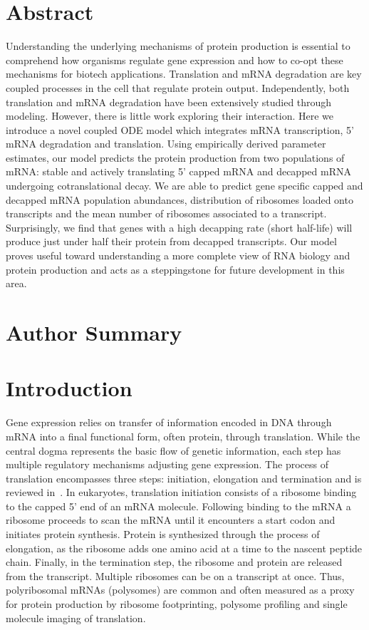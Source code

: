 \documentclass[10pt,letterpaper]{article}
\begin{document}
\section*{Abstract}
Understanding the underlying mechanisms of protein production is essential to comprehend how organisms regulate gene expression and how to co-opt these mechanisms for biotech applications. Translation and mRNA degradation are key coupled processes in the cell that regulate protein output. Independently, both translation and mRNA degradation have been extensively studied through modeling. However, there is little work exploring their interaction. Here we introduce a novel coupled ODE model which integrates mRNA transcription, 5' mRNA degradation and translation. Using empirically derived parameter estimates, our model predicts the protein production from two populations of mRNA: stable and actively translating 5' capped mRNA and decapped mRNA undergoing cotranslational decay. We are able to predict gene specific capped and decapped mRNA population abundances, distribution of ribosomes loaded onto transcripts and the mean number of ribosomes associated to a transcript. Surprisingly, we find that genes with a high decapping rate (short half-life) will produce just under half their protein from decapped transcripts. Our model proves useful toward understanding a more complete view of RNA biology and protein production and acts as a steppingstone for future development in this area. 
 

\section*{Author Summary}




\linenumbers

\section*{Introduction}

Gene expression relies on transfer of information encoded in DNA through mRNA into a final functional form, often protein, through translation. While the central dogma represents the basic flow of genetic information, each step has multiple regulatory mechanisms adjusting gene expression. The process of translation encompasses three steps: initiation, elongation and termination and is reviewed in~\cite{RN1,RN2}. In eukaryotes, translation initiation consists of a ribosome binding to the capped 5' end of an mRNA molecule. Following binding to the mRNA a ribosome proceeds to scan the mRNA until it encounters a start codon and initiates protein synthesis. Protein is synthesized through the process of elongation, as the ribosome adds one amino acid at a time to the nascent peptide chain. Finally, in the termination step, the ribosome and protein are released from the transcript. Multiple ribosomes can be on a transcript at once. Thus, polyribosomal mRNAs (polysomes) are common and often measured as a proxy for protein production by ribosome footprinting, polysome profiling and single molecule imaging of translation. %
\end{document}
